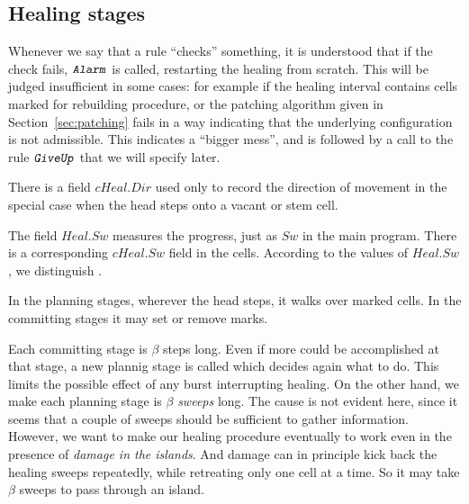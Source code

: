 \documentclass[12pt]{memoir}
\newcommand{\fld}[1]{\ensuremath{\textit{#1}}}
\newcommand{\rul}[1]{\ensuremath{\texttt{\slshape #1\/}}}
\newcommand{\Dir}{\fld{Dir}}
\newcommand{\Heal}{\fld{Heal}}
\newcommand{\cHeal}{\fld{cHeal}}
\newcommand{\Stage}{\fld{Stage}}
\newcommand{\Sweep}{\fld{Sw}}
\newcommand{\Committing}{\mathrm{Committing}}
\newcommand{\Planning}{\mathrm{Planing}}
\newcommand{\Alarm}{\rul{Alarm}}
\newcommand{\GiveUp}{\rul{GiveUp}}
\begin{document}
\subsection{Healing stages}\label{sec:rec-stages}

Whenever we say that a rule ``checks'' something,
it is understood that if the check fails, \( \Alarm \) is called, restarting the 
healing from scratch.
This will be judged insufficient in some cases: for example if 
the healing interval contains cells marked for rebuilding procedure,
or the patching algorithm given in Section~\ref{sec:patching} fails in a way
indicating that the underlying configuration is not admissible.
This indicates a ``bigger mess'', and is followed by a call to
the rule \( \GiveUp \) that we will specify later.

There is a field \( \cHeal.\Dir \) used only to record the direction
of movement in the special case when the head steps onto a vacant or stem cell.

The field \( \Heal.\Sweep \) 
measures the progress, just as \( \Sweep \) in the main program.
There is a corresponding \( \cHeal.\Sweep \) field in the cells.
According to the values of \( \Heal.\Sweep \), we distinguish .

In the planning stages, wherever the head steps, it walks over marked cells.
In the committing stages it may set or remove marks.

Each committing stage is \( \beta \) steps long.
Even if more could be accomplished at that stage, a new plannig stage
is called which decides again what to do.
This limits the possible effect of any burst interrupting healing.
On the other hand, we make 
each planning stage is \( \beta \) \emph{sweeps} long.
The cause is not evident here, since it seems  that a couple of sweeps should
be sufficient to gather information.
However, we want to make our healing procedure eventually to work even
in the presence of \emph{damage in the islands}.
And damage can in principle kick back the healing sweeps repeatedly, 
while retreating only one cell at a time.
So it may take \( \beta \) sweeps to pass through an island.
\end{document}
